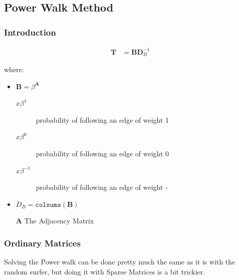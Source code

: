 \documentclass[11pt]{article}
\begin{document}
\subsection{Power Walk Method}
\label{sec:org4df60ce}
\subsubsection{Introduction}
\label{sec:org9ec10c9}

\begin{align}
\mathbf{T} &= \mathbf{B} \mathbf{D}^{-1}_{B} \label{eq:pwalk-def}
\end{align}



where:

\begin{itemize}
\item \(\mathbf{B}= \beta^{\mathbf{A}}\)
\begin{description}
\item[{\(x\beta^{1}\) }] probability of following an edge of weight 1
\item[{\(x\beta^{0}\) }] probability of following an edge of weight 0
\item[{\(x\beta^{-1}\)}] probability of following an edge of weight -
\end{description}
\item \(D_{B} = \mathtt{colsums}(\mathbf{B})\)
\item[{\(\mathbf{A}\)}] The Adjacency Matrix
\end{itemize}

\subsubsection{Ordinary Matrices}
\label{sec:org50777de}
Solving the Power walk can be done pretty much the same as it is with the random surfer, but doing it with Sparse Matrices is a bit trickier.
\end{document}
